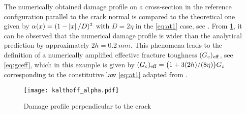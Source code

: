 The numerically obtained damage profile on a cross-section in the reference configuration parallel to the crack normal is compared to the theoretical one given by $\alpha(x)=(1-\left\lvert{x}\right\rvert/D)^2$ with $D=2\eta$ in the \eqref{eq:at1} case, see \cite{PhamAmorMarigoMaurini:2011}. From \cref{fig:damageprofile}, it can be observed that the numerical damage profile is wider than the analytical prediction by approximately $2h=\SI{0.2}{mm}$. This phenomena leads to the definition of a numerically amplified effective fracture toughness $(G_\mathrm{c})_\mathrm{eff}$, see \eqref{eq:gceff}, which in this example is given by $(G_\mathrm{c})_\mathrm{eff}=\bigl(1+3(2h)/(8\eta)\bigr)G_\mathrm{c}$ corresponding to the constitutive law \eqref{eq:at1} adapted from \cite{HossainHsuehBourdinBhattachary:2014}.
\begin{figure}[htbp]
\centering
\texttt{[image: kalthoff\_alpha.pdf]}
\caption{Damage profile perpendicular to the crack} \label{fig:damageprofile}
\end{figure}

